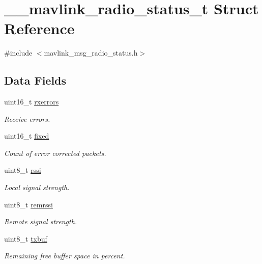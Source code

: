 \hypertarget{struct____mavlink__radio__status__t}{\section{\+\_\+\+\_\+mavlink\+\_\+radio\+\_\+status\+\_\+t Struct Reference}
\label{struct____mavlink__radio__status__t}
}


{\ttfamily \#include $<$mavlink\+\_\+msg\+\_\+radio\+\_\+status.\+h$>$}

\subsection*{Data Fields}
\begin{DoxyCompactItemize}
\item 
uint16\+\_\+t \hyperlink{struct____mavlink__radio__status__t_a8685a765f489e5c207d15d2d327744d8}{rxerrors}
\begin{DoxyCompactList}\small\item\em Receive errors. \end{DoxyCompactList}\item 
uint16\+\_\+t \hyperlink{struct____mavlink__radio__status__t_a7963729a484bb7268e6723a0076020c1}{fixed}
\begin{DoxyCompactList}\small\item\em Count of error corrected packets. \end{DoxyCompactList}\item 
uint8\+\_\+t \hyperlink{struct____mavlink__radio__status__t_a3094eceaedbb2f0d7e501a0ae29b1153}{rssi}
\begin{DoxyCompactList}\small\item\em Local signal strength. \end{DoxyCompactList}\item 
uint8\+\_\+t \hyperlink{struct____mavlink__radio__status__t_a300013070ad97c6c8cb6390c4d12e9d6}{remrssi}
\begin{DoxyCompactList}\small\item\em Remote signal strength. \end{DoxyCompactList}\item 
uint8\+\_\+t \hyperlink{struct____mavlink__radio__status__t_a8f9a9b8d333b127422cb8d5b8b2b1928}{txbuf}
\begin{DoxyCompactList}\small\item\em Remaining free buffer space in percent. \end{DoxyCompactList}\item 

\end{DoxyCompactItemize}
